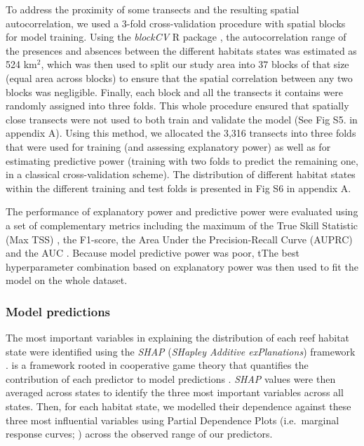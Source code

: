 \begin{refsection}
To address the proximity of some transects and the resulting spatial
autocorrelation, we used a 3-fold cross-validation procedure with
spatial blocks for model training. Using the \emph{blockCV} R package
\autocite{Valavi_2019}, the autocorrelation range of the presences and
absences between the different habitats states was estimated as 524
km\(^2\), which was then used to split our study area into 37 blocks of
that size (equal area across blocks) to ensure that the spatial
correlation between any two blocks was negligible. Finally, each block
and all the transects it contains were randomly assigned into three
folds. This whole procedure ensured that spatially close transects were
not used to both train and validate the model (See Fig S5. in appendix
A). Using this method, we allocated the 3,316 transects into three folds
that were used for training (and assessing explanatory power) as well as
for estimating predictive power (training with two folds to predict the
remaining one, in a classical cross-validation scheme). The distribution
of different habitat states within the different training and test folds
is presented in Fig S6 in appendix A.

The performance of explanatory power and predictive power were evaluated
using a set of complementary metrics including the maximum of the True
Skill Statistic (Max TSS) \autocite{Allouche_2006}, the F1-score, the
Area Under the Precision-Recall Curve (AUPRC) \autocite{Flach_2015} and
the AUC \autocite{Fawcett_2006}. Because model predictive power was
poor, tThe best hyperparameter combination based on explanatory power
was then used to fit the model on the whole dataset.

\hypertarget{model-predictions}{%
\subsubsection{Model predictions}\label{model-predictions}}

The most important variables in explaining the distribution of each reef
habitat state were identified using the \emph{SHAP} (\emph{SHapley
Additive exPlanations}) framework \autocite{Lundberg_2017}. is a
framework rooted in cooperative game theory \autocite{Shapley_1953} that
quantifies the contribution of each predictor to model predictions
\autocite{Lundberg_2017}. \emph{SHAP} values were then averaged across
states to identify the three most important variables across all states.
Then, for each habitat state, we modelled their dependence against these
three most influential variables using Partial Dependence Plots
(i.e.~marginal response curves; \textcite{Molnar_2022}) across the
observed range of our predictors.


\end{refsection}

